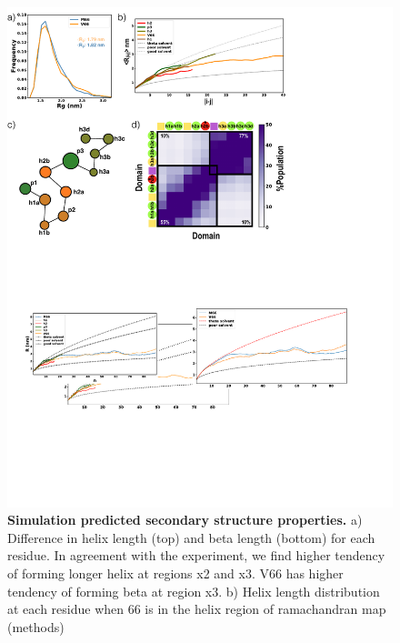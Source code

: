 \documentclass[journal=jacsat,manuscript=article]{achemso}
\begin{document}
\begin{figure}[!ht]
\includegraphics[scale=0.5,width=12cm,trim={0 0cm 0 0cm},clip]{../figures/fig3.pdf}

\caption{{\bf Simulation predicted secondary structure properties.}
a) Difference in helix length (top) and beta length (bottom) for each residue. In agreement with the experiment, we find higher tendency of forming longer helix at regions x2 and x3. V66 has higher tendency of forming beta at region x3.  b) Helix length distribution at each residue when 66 is in the helix region of ramachandran map (methods) }

\label{fig3} 
\end{figure}
\end{document}
